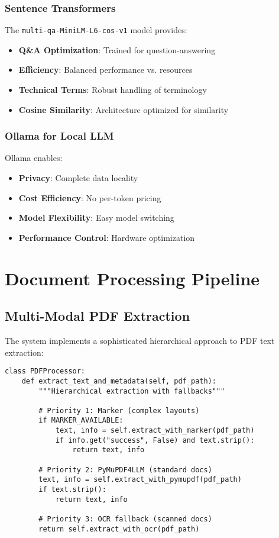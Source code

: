 \documentclass[10pt,a4paper,twocolumn]{article}
\begin{document}
\subsubsection{Sentence Transformers}
The \texttt{multi-qa-MiniLM-L6-cos-v1} model provides:
\begin{itemize}[leftmargin=1em]
    \item \textbf{Q\&A Optimization}: Trained for question-answering
    \item \textbf{Efficiency}: Balanced performance vs. resources
    \item \textbf{Technical Terms}: Robust handling of terminology
    \item \textbf{Cosine Similarity}: Architecture optimized for similarity
\end{itemize}

\subsubsection{Ollama for Local LLM}
Ollama enables:
\begin{itemize}[leftmargin=1em]
    \item \textbf{Privacy}: Complete data locality
    \item \textbf{Cost Efficiency}: No per-token pricing
    \item \textbf{Model Flexibility}: Easy model switching
    \item \textbf{Performance Control}: Hardware optimization
\end{itemize}

\section{Document Processing Pipeline}

\subsection{Multi-Modal PDF Extraction}

The system implements a sophisticated hierarchical approach to PDF text extraction:

\begin{lstlisting}[caption={Hierarchical PDF Processing}]
class PDFProcessor:
    def extract_text_and_metadata(self, pdf_path):
        """Hierarchical extraction with fallbacks"""
        
        # Priority 1: Marker (complex layouts)
        if MARKER_AVAILABLE:
            text, info = self.extract_with_marker(pdf_path)
            if info.get("success", False) and text.strip():
                return text, info
        
        # Priority 2: PyMuPDF4LLM (standard docs)
        text, info = self.extract_with_pymupdf(pdf_path)
        if text.strip():
            return text, info
            
        # Priority 3: OCR fallback (scanned docs)
        return self.extract_with_ocr(pdf_path)
\end{lstlisting}
\end{document}
